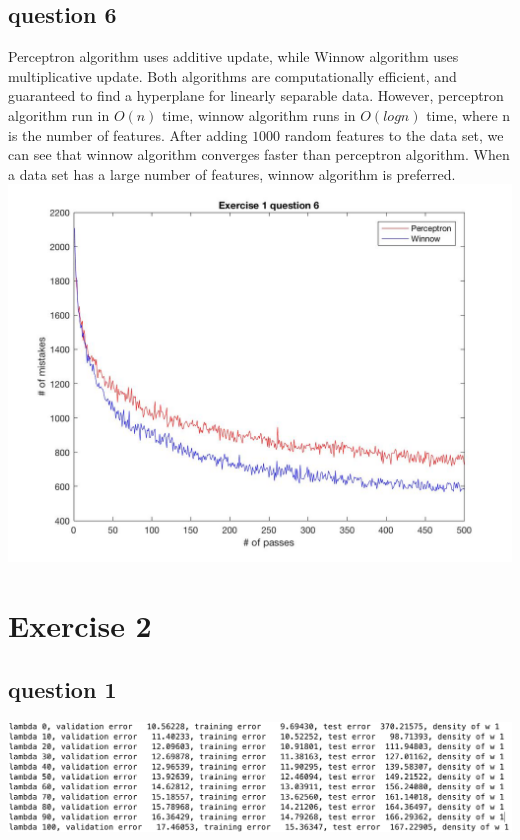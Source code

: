 \documentclass[11pt]{article} %
\begin{document}
\subsection{question 6}
Perceptron algorithm uses additive update, while Winnow algorithm uses multiplicative update. Both algorithms are computationally efficient, and guaranteed to find a hyperplane for linearly separable data. However, perceptron algorithm run in $O(n)$ time, winnow algorithm runs in $O(logn)$ time, where n is the number of features. After adding $1000$ random features to the data set, we can see that winnow algorithm converges faster than perceptron algorithm. When a data set has a large number of features, winnow algorithm is preferred.\\
\includegraphics[scale=0.4]{e1q6.jpg}
\section{Exercise 2}
\subsection{question 1}
\includegraphics[scale=0.5]{e2q1}\\
\end{document}
